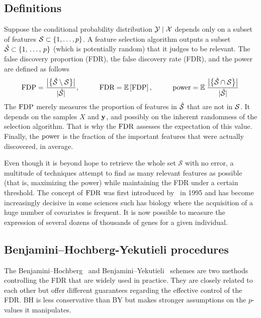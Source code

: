 \subsection{Definitions}\label{subsec:fdr_def}

Suppose the conditional probability distribution $\mathcal{Y} \mid \mathcal{X}$ depends only on a subset of features
$\mathcal{S} \subset \left\{ 1, \dots, p \right\}$.
A feature selection algorithm outputs a subset $\hat{\mathcal{S}} \subset \left\{ 1,\, \dots,\, p \right\}$ (which is potentially random)
that it judges to be relevant.
The false discovery proportion (FDR), the false discovery rate (FDR), and the power are defined as follows
\begin{equation}\label{eq:fdr_def}
    \text{FDP} = \frac
        {\big\lvert \big\{ \hat{\mathcal{S}} \setminus \mathcal{S} \big\} \big\rvert}
        {\lvert \hat{\mathcal{S}} \rvert}
    \text{,}\qquad\quad
    \text{FDR} = {\mathbb E}\left[\text{FDP}\right]
    \text{,}\qquad\quad
    \text{power} = {\mathbb E}\left.
        \frac
            {\big\lvert \big\{ \hat{\mathcal{S}} \cap \mathcal{S} \big\} \big\rvert}
            {\lvert\hat{\mathcal{S}}\rvert}
    \right.
\end{equation}
The $\text{FDP}$ merely measures the proportion of features in $\hat{\mathcal{S}}$ that are not in $\mathcal{S}$.
It depends on the samples $X$ and $\mathbf{y}$,
and possibly on the inherent randomness of the selection algorithm.
That is why the $\text{FDR}$ assesses the expectation of this value.
Finally, the $\text{power}$ is the fraction of the important features that were actually discovered, in average.

Even though it is beyond hope to retrieve the whole set $\mathcal{S}$ with no error,
a multitude of techniques attempt to find as many relevant features as possible
(that is, maximizing the power)
while maintaining the FDR under a certain threshold.
The concept of $\text{FDR}$ was first introduced by~\cite{bh} in 1995 and has become increasingly decisive in some
sciences such has biology where the acquisition of a huge number of covariates is frequent.
It is now possible to measure the expression of several dozens of thousands of genes for a given individual.

\subsection{Benjamini–Hochberg-Yekutieli procedures}\label{subsec:bhq}

The Benjamini–Hochberg~\cite{bh} and Benjamini–Yekutieli~\cite{by} schemes are two methods controlling the FDR
that are widely used in practice.
They are closely related to each other but offer different guarantees regarding the effective control of the FDR\@.
BH is less conservative than BY but makes stronger assumptions on the $p$-values it manipulates.

